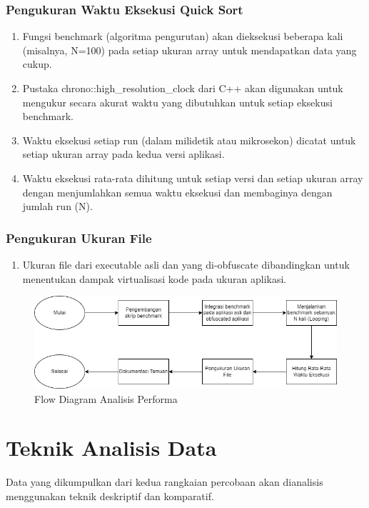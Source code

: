 \subsubsection{Pengukuran Waktu Eksekusi Quick Sort}
\begin{enumerate}
	\item {} Fungsi benchmark (algoritma pengurutan) akan dieksekusi beberapa kali (misalnya, N=100) pada setiap ukuran array untuk mendapatkan data yang cukup.
	\item {} Pustaka chrono::high\_resolution\_clock dari C++ akan digunakan untuk mengukur secara akurat waktu yang dibutuhkan untuk setiap eksekusi benchmark.
	\item {} Waktu eksekusi setiap run (dalam milidetik atau mikrosekon) dicatat untuk setiap ukuran array pada kedua versi aplikasi.
	\item {} Waktu eksekusi rata-rata dihitung untuk setiap versi dan setiap ukuran array dengan menjumlahkan semua waktu eksekusi dan membaginya dengan jumlah run (N).
\end{enumerate}

\subsubsection{Pengukuran Ukuran File}
\begin{enumerate}
	\item {} Ukuran file dari executable asli dan yang di-obfuscate dibandingkan untuk menentukan dampak virtualisasi kode pada ukuran aplikasi.
\end{enumerate}

\begin{figure}
	\centering
	\includegraphics[width=1\textwidth]
	{assets/pics/Performance.png}
	\caption{Flow Diagram Analisis Performa}
\end{figure}

\section{Teknik Analisis Data}
Data yang dikumpulkan dari kedua rangkaian percobaan akan dianalisis menggunakan teknik deskriptif dan komparatif.
